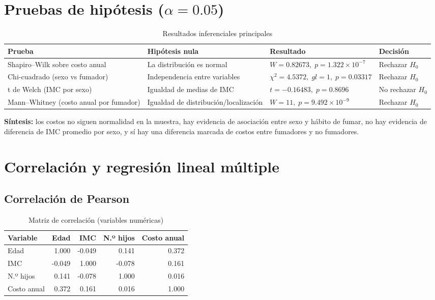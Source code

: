 \documentclass[12pt,a4paper]{article}
\begin{document}
\section{Pruebas de hipótesis (\(\alpha=0.05\))}
\begin{table}[H]
\centering
\caption{Resultados inferenciales principales}
\begin{tabular}{p{4cm}p{5cm}p{4cm}p{2cm}}
\toprule
\textbf{Prueba} & \textbf{Hipótesis nula} & \textbf{Resultado} & \textbf{Decisión} \\
\midrule
Shapiro--Wilk sobre costo anual & La distribución es normal & \(W=0.82673,\; p=1.322\times 10^{-7}\) & Rechazar \(H_0\) \\
\addlinespace
Chi-cuadrado (sexo vs fumador) & Independencia entre variables & \(\chi^2=4.5372,\; gl=1,\; p=0.03317\) & Rechazar \(H_0\) \\
\addlinespace
t de Welch (IMC por sexo) & Igualdad de medias de IMC & \(t=-0.16483,\; p=0.8696\) & No rechazar \(H_0\) \\
\addlinespace
Mann--Whitney (costo anual por fumador) & Igualdad de distribución/localización & \(W=11,\; p=9.492\times 10^{-9}\) & Rechazar \(H_0\) \\
\bottomrule
\end{tabular}
\end{table}

\noindent \textbf{Síntesis:} los costos no siguen normalidad en la muestra, hay evidencia de asociación entre sexo y hábito de fumar, no hay evidencia de diferencia de IMC promedio por sexo, y sí hay una diferencia marcada de costos entre fumadores y no fumadores.

\section{Correlación y regresión lineal múltiple}
\subsection{Correlación de Pearson}
\begin{table}[H]
\centering
\caption{Matriz de correlación (variables numéricas)}
\begin{tabular}{lrrrr}
\toprule
\textbf{Variable} & \textbf{Edad} & \textbf{IMC} & \textbf{N.º hijos} & \textbf{Costo anual} \\
\midrule
Edad      & 1.000 & -0.049 & 0.141 & 0.372 \\
IMC       & -0.049 & 1.000 & -0.078 & 0.161 \\
N.º hijos & 0.141 & -0.078 & 1.000 & 0.016 \\
Costo anual  & 0.372 & 0.161 & 0.016 & 1.000 \\
\bottomrule
\end{tabular}
\end{table}
\end{document}
